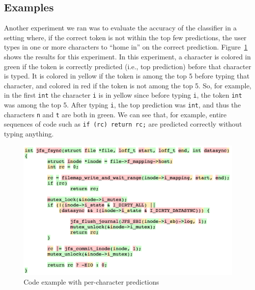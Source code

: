 \subsection{Examples}
\label{sec:examples}

Another experiment we ran was to evaluate the accuracy of the classifier in a
setting where, if the correct token is not within the top few predictions, the
user types in one or more characters to ``home in'' on the correct prediction.
Figure~\ref{fig:codeexample} shows the results for this experiment. In this
experiment, a character is colored in green if the token is correctly predicted
(i.e., top prediction) before that character is typed. It is colored in yellow
if the token is among the top 5 before typing that character, and colored in red
if the token is not among the top 5. So, for example, in the first
{\tt int} the character {\tt i} is in yellow since before typing {\tt i}, the
token {\tt int} was among the top 5. After typing {\tt i}, the top prediction
was {\tt int}, and thus the characters {\tt n} and {\tt t} are both in green. We
can see that, for example, entire sequences of code such as {\tt if (rc) return
rc;} are predicted correctly without typing anything.
\begin{figure}[h]
  \centering
  \includegraphics[width=\linewidth]{figs/code_example.png}
  \caption{Code example with per-character predictions}
  \label{fig:codeexample}
\end{figure}

